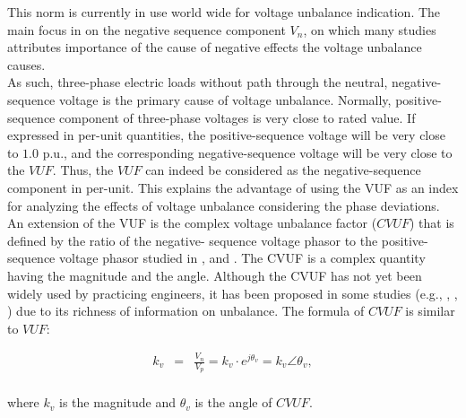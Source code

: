 This norm is currently in use world wide for voltage unbalance indication. The main focus in on the negative sequence component $V_n$, on which many studies attributes importance of the cause of negative effects the voltage unbalance causes.\\
	As such, three-phase electric loads without path through the neutral, negative-sequence voltage is the primary cause of voltage unbalance. Normally, positive-sequence component of three-phase voltages is very close to rated value. If expressed in per-unit quantities, the positive-sequence voltage will be very close to $1.0$ p.u., and the corresponding negative-sequence voltage will be very close to the $VUF$. Thus, the $VUF$ can indeed be considered as the negative-sequence component in per-unit.	This explains the advantage of using the VUF as an index for analyzing the effects of voltage unbalance considering the phase deviations.
	An extension of the VUF is the complex voltage unbalance factor ($CVUF$) that is defined by the ratio of the negative-
sequence voltage phasor to the positive-sequence voltage phasor studied in \cite{wang2000analytical}, and \cite{pierrat1987unbalance}. The CVUF is a complex quantity having the magnitude and the angle. Although the CVUF has not yet been widely used by practicing engineers, it has been proposed in some studies (e.g., \cite{wang2001analysis}, \cite{singh2007some}, \cite{chen2013examination}) due to its richness of information on unbalance. The formula of $CVUF$ is similar to $VUF$:

\begin{equation}
        \begin{array}{rcl}
            k_v&=&\frac{V_n}{V_p}=k_v\cdot e^{j\theta_v}=k_v\angle\theta_v,\\					
        \end{array}
        \label{BASICUNB:equ:CVUF}
    \end{equation}
		
		where $k_v$ is the magnitude and $\theta_v$ is the angle of $CVUF$.
		
